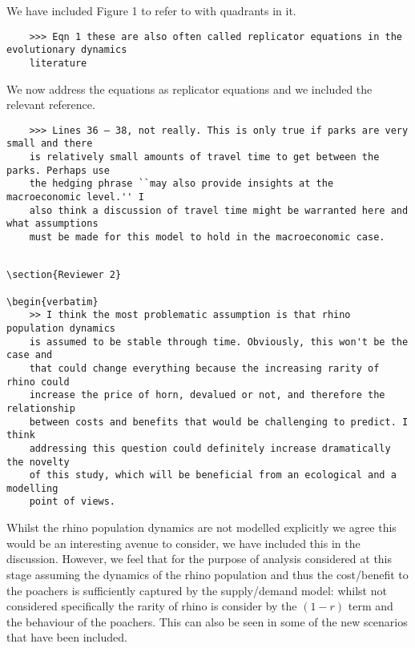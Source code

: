 \documentclass[10pt]{article}
\begin{document}
We have included Figure 1 to refer to with quadrants in it.

\begin{verbatim}
    >>> Eqn 1 these are also often called replicator equations in the evolutionary dynamics
    literature
\end{verbatim}

We now address the equations as replicator equations and we included the relevant
reference.

\begin{verbatim}
    >>> Lines 36 – 38, not really. This is only true if parks are very small and there
    is relatively small amounts of travel time to get between the parks. Perhaps use
    the hedging phrase ``may also provide insights at the macroeconomic level.'' I
    also think a discussion of travel time might be warranted here and what assumptions
    must be made for this model to hold in the macroeconomic case.
\end{verbatim}


\begin{verbatim}

\section{Reviewer 2}

\begin{verbatim}
    >> I think the most problematic assumption is that rhino population dynamics
    is assumed to be stable through time. Obviously, this won't be the case and
    that could change everything because the increasing rarity of rhino could
    increase the price of horn, devalued or not, and therefore the relationship
    between costs and benefits that would be challenging to predict. I think
    addressing this question could definitely increase dramatically the novelty
    of this study, which will be beneficial from an ecological and a modelling
    point of views.
\end{verbatim}

Whilst the rhino population dynamics are not modelled explicitly we agree this
would be an interesting avenue to consider, we have included this in the
discussion. However, we feel that for the purpose of analysis considered at this
stage assuming the dynamics of the rhino population and thus the cost/benefit to
the poachers is sufficiently captured by the supply/demand model: whilst not
considered specifically the rarity of rhino is consider by the \((1-r)\) term
and the behaviour of the poachers. This can also be seen in some of the new
scenarios that have been included.
\end{document}
